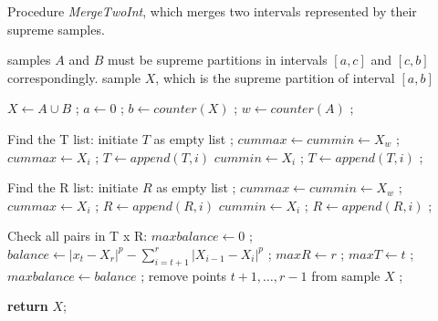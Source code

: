 \documentclass[12pt, a4paper]{article}
\numberwithin{equation}{section}
\begin{document}
\begin{algorithm}[H]
\caption{Procedure \emph{MergeTwoInt}, which merges two
intervals represented by their supreme samples. }
\label{alg:MergeTwoInt}
\begin{algorithmic}[1]
\Require samples $A$ and $B$ must be supreme partitions in
intervals $[a,c]$ and $[c,b]$ correspondingly.
\Output sample $X$, which is the supreme partition of interval $[a,b]$
\item[]

\State $X \leftarrow A \cup  B$ ;   
\State $a \leftarrow 0$ ;     
\State $b \leftarrow counter(X)$ ;
\State $w \leftarrow counter(A)$ ;
\item[]
\item[] \Comment Find the T list:
\State initiate $T$ as empty list ;
\State $cummax \leftarrow cummin \leftarrow X_w$ ;
    \State $cummax \leftarrow X_i$ ;
    \State $T \leftarrow append(T, i)$
  \EndIf
    \State $cummin \leftarrow X_i$ ;
	\State $T \leftarrow append(T, i)$ ;
  \EndIf   
\EndFor
\item[]
\item[] \Comment Find the R list:
\State initiate $R$ as empty list ;
\State $cummax \leftarrow cummin \leftarrow X_w$ ;
    \State $cummax \leftarrow X_i$ ;
    \State $R \leftarrow append(R, i)$
  \EndIf
    \State $cummin \leftarrow X_i$ ;
	\State $R \leftarrow append(R, i)$ ;
  \EndIf   
\EndFor
{}
\end{algorithmic}
\end{algorithm}


\begin{algorithm}[H]                     
\begin{algorithmic} [1]                

\item[] \Comment Check all pairs in T x R:
\State $maxbalance \leftarrow 0$ ; 
    \State $balance \leftarrow |x_t - X_r|^p - \sum_{i=t+1}^r |X_{i-1}-X_i|^p$ ;
      	\State $maxR \leftarrow r$ ;
        \State $maxT \leftarrow t$ ;
        \State $maxbalance \leftarrow balance$ ;
      \EndIf
  \EndFor      
\EndFor
{}
  \State remove points $t+1, \dots, r-1$ from sample $X$ ;
\EndIf


\State \textbf{return} $X$;
\EndFunction
\end{algorithmic}
\end{algorithm}
\end{document}
